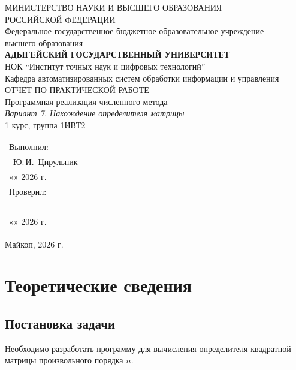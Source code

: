 \documentclass[14pt,a4paper]{extarticle}
\begin{document}
\begin{titlepage}
\begin{center}
МИНИСТЕРСТВО НАУКИ И ВЫСШЕГО ОБРАЗОВАНИЯ\\
РОССИЙСКОЙ ФЕДЕРАЦИИ\\
Федеральное государственное бюджетное образовательное учреждение\\
высшего образования\\[0.5cm]
{\Large\bfseries АДЫГЕЙСКИЙ ГОСУДАРСТВЕННЫЙ УНИВЕРСИТЕТ}\\[0.3cm]
НОК ``Институт точных наук и цифровых технологий''\\
Кафедра автоматизированных систем обработки информации и управления\\
\vfill
{\Large ОТЧЕТ ПО ПРАКТИЧЕСКОЙ РАБОТЕ}\\[0.5cm]
{\Large Программная реализация численного метода}\\
{\Large\itshape Вариант 7. Нахождение определителя матрицы}\\[0.5cm]
1 курс, группа 1ИВТ2\\
\vfill
\begin{flushright}
\begin{tabular}{l}
Выполнил: \\
\hrulefill\ Ю.\,И.\ Цирульник \\
«\underline{\hspace{1cm}}» \underline{\hspace{2cm}} 2026 г. \\[0.5cm]
Проверил: \\
\hrulefill\ \underline{\hspace{6cm}} \\
«\underline{\hspace{1cm}}» \underline{\hspace{2cm}} 2026 г. \\
\end{tabular}
\end{flushright}
\vfill
Майкоп, 2026 г.
\end{center}
\end{titlepage}


\section{Теоретические сведения}

\subsection*{Постановка задачи}
Необходимо разработать программу для вычисления определителя квадратной матрицы произвольного порядка $n$.
\end{document}
